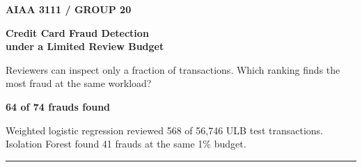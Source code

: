 \documentclass{article}
\newcommand{\body}{\fontsize{40}{53}\selectfont}
\newcommand{\ruleline}{\par\nointerlineskip\textcolor{Line}{\rule{\linewidth}{0.8mm}}\par}
\begin{document}
\color{Ink}
\body
{\color{Accent}\fontsize{27}{34}\selectfont\bfseries AIAA 3111 \quad / \quad GROUP 20\par}
\vspace{5mm}
{\fontsize{84}{89}\selectfont\bfseries Credit Card Fraud Detection\\
under a Limited Review Budget\par}
\vspace{5mm}
{\fontsize{35}{45}\selectfont Reviewers can inspect only a fraction of transactions. Which ranking finds the most fraud at the same workload?\par}

\vspace{7mm}
\setlength{\fboxsep}{10mm}
\colorbox{Panel}{\begin{minipage}{\dimexpr\linewidth-2\fboxsep\relax}
{\color{Accent}\fontsize{61}{69}\selectfont\bfseries 64 of 74 frauds found\par}
{\fontsize{30}{39}\selectfont Weighted logistic regression reviewed 568 of 56,746 ULB test transactions. Isolation Forest found 41 frauds at the same 1\% budget.\par}
\end{minipage}}

\vspace{9mm}
\ruleline
\end{document}
